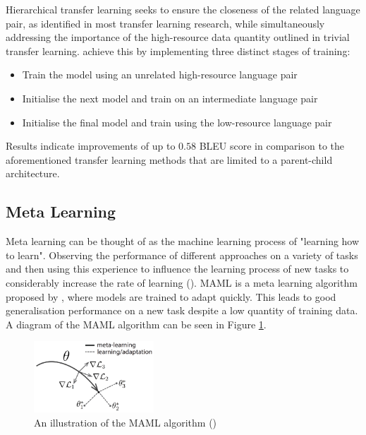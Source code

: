 Hierarchical transfer learning seeks to ensure the closeness of the related language pair, as identified in most transfer learning research, while simultaneously addressing the importance of the high-resource data quantity outlined in trivial transfer learning. \cite{luo_hierarchical_2019} achieve this by implementing three distinct stages of training:

\begin{itemize}
  \item Train the model using an unrelated high-resource language pair
  \item Initialise the next model and train on an intermediate language pair
  \item Initialise the final model and train using the low-resource language pair
\end{itemize}

Results indicate improvements of up to $0.58$ \acrshort{BLEU} score in comparison to the aforementioned transfer learning methods that are limited to a parent-child architecture.

\subsection{Meta Learning}
\label{sec-2:meta_learning}

Meta learning can be thought of as the machine learning process of "learning how to learn". Observing the performance of different approaches on a variety of tasks and then using this experience to influence the learning process of new tasks to considerably increase the rate of learning (\cite{vanschoren_meta-learning:_2018}).
\acrfull{MAML} is a meta learning algorithm proposed by \cite{finn_model-agnostic_2017}, where models are trained to adapt quickly. This leads to good generalisation performance on a new task despite a low quantity of training data.
A diagram of the \acrshort{MAML} algorithm can be seen in Figure \ref{fig:MAML}.

\begin{figure}[ht!]
\centering
\includegraphics[width=0.40\textwidth]{media/literature/nmt_approaches/maml.png}
\caption[Diagram of a \gls{MAML} algorithm]{An illustration of the \Gls{MAML} algorithm (\cite{finn_model-agnostic_2017})}
\label{fig:MAML}
\end{figure}

